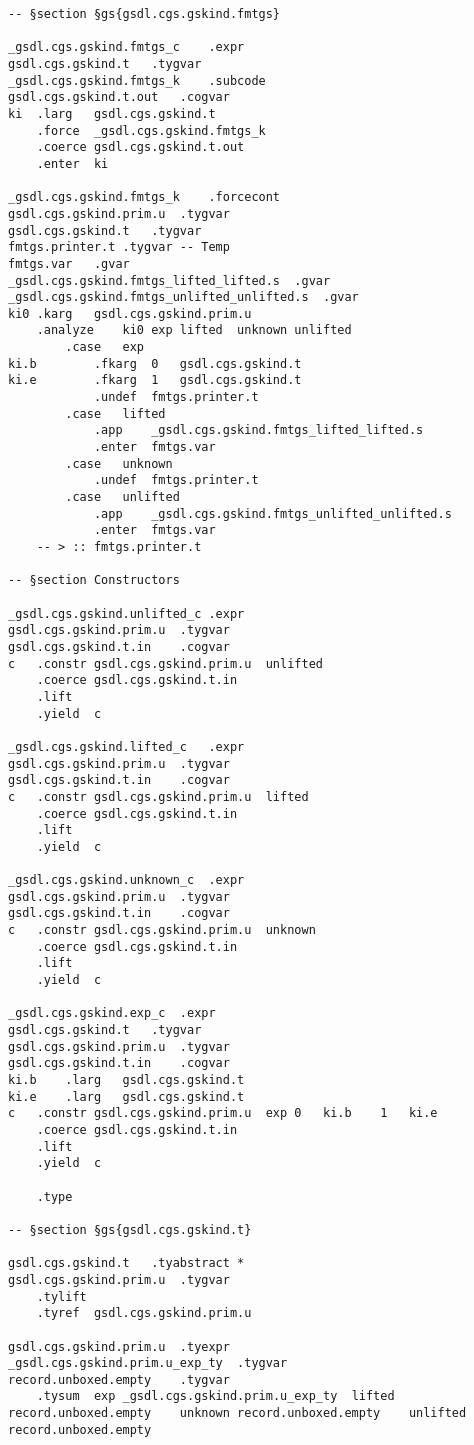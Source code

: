 \documentclass{report}
\begin{document}
\begin{verbatim}
-- §section §gs{gsdl.cgs.gskind.fmtgs}

_gsdl.cgs.gskind.fmtgs_c	.expr
gsdl.cgs.gskind.t	.tygvar
_gsdl.cgs.gskind.fmtgs_k	.subcode
gsdl.cgs.gskind.t.out	.cogvar
ki	.larg	gsdl.cgs.gskind.t
	.force	_gsdl.cgs.gskind.fmtgs_k
	.coerce	gsdl.cgs.gskind.t.out
	.enter	ki

_gsdl.cgs.gskind.fmtgs_k	.forcecont
gsdl.cgs.gskind.prim.u	.tygvar
gsdl.cgs.gskind.t	.tygvar
fmtgs.printer.t	.tygvar	-- Temp
fmtgs.var	.gvar
_gsdl.cgs.gskind.fmtgs_lifted_lifted.s	.gvar
_gsdl.cgs.gskind.fmtgs_unlifted_unlifted.s	.gvar
ki0	.karg	gsdl.cgs.gskind.prim.u
	.analyze	ki0	exp	lifted	unknown	unlifted
		.case	exp
ki.b		.fkarg	0	gsdl.cgs.gskind.t
ki.e		.fkarg	1	gsdl.cgs.gskind.t
			.undef	fmtgs.printer.t
		.case	lifted
			.app	_gsdl.cgs.gskind.fmtgs_lifted_lifted.s
			.enter	fmtgs.var
		.case	unknown
			.undef	fmtgs.printer.t
		.case	unlifted
			.app	_gsdl.cgs.gskind.fmtgs_unlifted_unlifted.s
			.enter	fmtgs.var
	-- > :: fmtgs.printer.t

-- §section Constructors

_gsdl.cgs.gskind.unlifted_c	.expr
gsdl.cgs.gskind.prim.u	.tygvar
gsdl.cgs.gskind.t.in	.cogvar
c	.constr	gsdl.cgs.gskind.prim.u	unlifted
	.coerce	gsdl.cgs.gskind.t.in
	.lift
	.yield	c

_gsdl.cgs.gskind.lifted_c	.expr
gsdl.cgs.gskind.prim.u	.tygvar
gsdl.cgs.gskind.t.in	.cogvar
c	.constr	gsdl.cgs.gskind.prim.u	lifted
	.coerce	gsdl.cgs.gskind.t.in
	.lift
	.yield	c

_gsdl.cgs.gskind.unknown_c	.expr
gsdl.cgs.gskind.prim.u	.tygvar
gsdl.cgs.gskind.t.in	.cogvar
c	.constr	gsdl.cgs.gskind.prim.u	unknown
	.coerce	gsdl.cgs.gskind.t.in
	.lift
	.yield	c

_gsdl.cgs.gskind.exp_c	.expr
gsdl.cgs.gskind.t	.tygvar
gsdl.cgs.gskind.prim.u	.tygvar
gsdl.cgs.gskind.t.in	.cogvar
ki.b	.larg	gsdl.cgs.gskind.t
ki.e	.larg	gsdl.cgs.gskind.t
c	.constr	gsdl.cgs.gskind.prim.u	exp	0	ki.b	1	ki.e
	.coerce	gsdl.cgs.gskind.t.in
	.lift
	.yield	c

	.type

-- §section §gs{gsdl.cgs.gskind.t}

gsdl.cgs.gskind.t	.tyabstract	*
gsdl.cgs.gskind.prim.u	.tygvar
	.tylift
	.tyref	gsdl.cgs.gskind.prim.u

gsdl.cgs.gskind.prim.u	.tyexpr
_gsdl.cgs.gskind.prim.u_exp_ty	.tygvar
record.unboxed.empty	.tygvar
	.tysum	exp	_gsdl.cgs.gskind.prim.u_exp_ty	lifted	record.unboxed.empty	unknown	record.unboxed.empty	unlifted	record.unboxed.empty


\end{verbatim}
\end{document}
